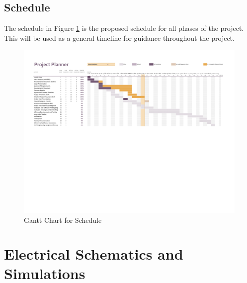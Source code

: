 \documentclass{article}
\makeatletter
\numberwithin{figure}{section}
\numberwithin{equation}{section}
\let\oldappendix\appendix %
\renewcommand\appendix{%
    \oldappendix
    \newcommand{\section@cntformat}{\appendixname~\thesection\quad}
}
\makeatother
\begin{document}
{\begin{landscape}
\subsection{Schedule} \label{sect:schedule}
The schedule in Figure \ref{fig:gantt} is the proposed schedule for all phases of the project. This will be used as a general timeline for guidance throughout the project.

\begin{figure}[H]
  \centering
  \includegraphics[scale=0.85, trim=0cm 12cm 0cm 0cm, clip=true]{Schedule.pdf}
  \caption{Gantt Chart for Schedule}
  \label{fig:gantt}
\end{figure}
\end{landscape}


\newpage
\vspace*{\fill}
\section*{}
\vspace*{\fill}
\newpage
\appendix
\section{Electrical Schematics and Simulations} \label{sect:appendixA}

}
\end{document}
